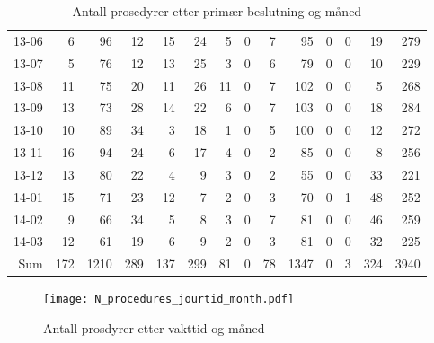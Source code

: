 \documentclass[presentation,xcolor=pdftex,dvipsnames,table]{beamer}
\begin{document}
\begin{frame}
\begin{tiny}
\begin{table}[ht]
\begin{tabular}{rrrrrrrrrrrrrr}
  13-06 & 6 & 96 & 12 & 15 & 24 & 5 & 0 & 7 & 95 & 0 & 0 & 19 & 279 \\ 
  13-07 & 5 & 76 & 12 & 13 & 25 & 3 & 0 & 6 & 79 & 0 & 0 & 10 & 229 \\ 
  13-08 & 11 & 75 & 20 & 11 & 26 & 11 & 0 & 7 & 102 & 0 & 0 & 5 & 268 \\ 
  13-09 & 13 & 73 & 28 & 14 & 22 & 6 & 0 & 7 & 103 & 0 & 0 & 18 & 284 \\ 
  13-10 & 10 & 89 & 34 & 3 & 18 & 1 & 0 & 5 & 100 & 0 & 0 & 12 & 272 \\ 
  13-11 & 16 & 94 & 24 & 6 & 17 & 4 & 0 & 2 & 85 & 0 & 0 & 8 & 256 \\ 
  13-12 & 13 & 80 & 22 & 4 & 9 & 3 & 0 & 2 & 55 & 0 & 0 & 33 & 221 \\ 
  14-01 & 15 & 71 & 23 & 12 & 7 & 2 & 0 & 3 & 70 & 0 & 1 & 48 & 252 \\ 
  14-02 & 9 & 66 & 34 & 5 & 8 & 3 & 0 & 7 & 81 & 0 & 0 & 46 & 259 \\ 
  14-03 & 12 & 61 & 19 & 6 & 9 & 2 & 0 & 3 & 81 & 0 & 0 & 32 & 225 \\ 
  Sum & 172 & 1210 & 289 & 137 & 299 & 81 & 0 & 78 & 1347 & 0 & 3 & 324 & 3940 \\ 
   \bottomrule
\end{tabular}
\caption{Antall prosedyrer etter primær beslutning og måned} 
\end{table}\end{tiny}
\end{frame}




\begin{frame}
\begin{figure}
  \centering
  \caption{Antall prosdyrer etter vakttid og måned}
\texttt{[image: N\_procedures\_jourtid\_month.pdf]}
\end{figure}\end{frame}
\end{document}
